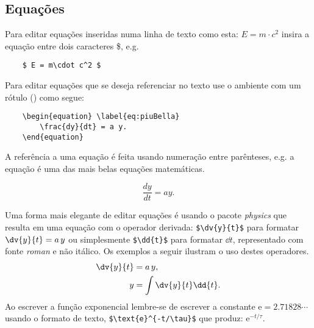 \subsection{Equações} 
Para editar equações inseridas numa linha de texto como esta: $ E = m\cdot c^2 $ insira a equação entre dois  caracteres \$, e.g.
\begin{verbatim}
	$ E = m\cdot c^2 $ 
\end{verbatim} 

Para editar equações que se deseja referenciar no texto use o ambiente  com um rótulo () como segue:

\begin{verbatim}
	\begin{equation} \label{eq:piuBella}
		\frac{dy}{dt} = a y.   
	\end{equation}
\end{verbatim}
A referência a uma equação é feita usando numeração entre parênteses, e.g. a equação  é uma das mais belas equações matemáticas.

\begin{equation} \label{eq:piuBella}
	\frac{dy}{dt} = a y.   
\end{equation}

Uma forma mais elegante de editar equações é usando o pacote \emph{physics} que resulta em uma equação com o operador derivada: \verb|$\dv{y}{t}$| para formatar $\dv{y}{t} = a \, y$ ou simplesmente   \verb|$\dd{t}$| para formatar $\dd{t}$, representado com fonte \emph{roman} e não itálico. Os exemplos a seguir ilustram o uso destes operadores. 
\begin{align} \label{eq:piuBella2}
	\dv{y}{t} &= a \, y, \\  %
	y &= \int \dv{y}{t} \dd{t}.   %
\end{align}
Ao escrever a função exponencial lembre-se de escrever a constante $\text{e}=2.71828\cdots$ usando o formato de texto, \verb|$\text{e}^{-t/\tau}$| que produz: $\text{e}^{-t/\tau}$.


